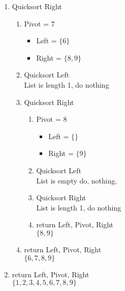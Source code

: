 \documentclass[12pt]{article}  %
\begin{document}
\begin{enumerate}
    \item Quicksort Right
    \begin{enumerate}
        \item Pivot = 7
        \begin{itemize}
            \item Left = $\{6\}$
            \item Right = $\{8,9\}$
        \end{itemize}
        \item Quicksort Left\\
            List is length 1, do nothing
        \item Quicksort Right
        \begin{enumerate}
            \item Pivot = 8
            \begin{itemize}
                \item Left = $\{\}$
                \item Right = $\{9\}$
            \end{itemize}
            \item Quicksort Left\\
            List is empty do, nothing.
            \item Quicksort Right\\
            List is length 1, do nothing
            \item return Left, Pivot, Right\\
            $\{8,9\}$
        \end{enumerate}
        \item return Left, Pivot, Right\\
        $\{6,7,8,9\}$
    \end{enumerate}
    
    \item return Left, Pivot, Right\\
    $\{1,2,3,4,5,6,7,8,9\}$
\end{enumerate}
\end{document}
